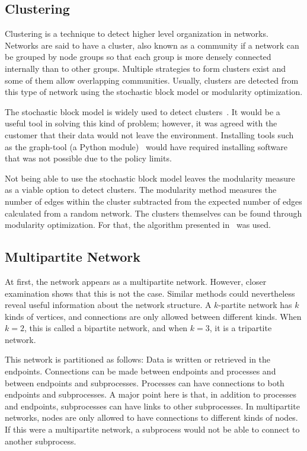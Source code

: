 \documentclass[english, 12pt, a4paper, sci, utf8, a-2b, online, obeyspaces]{aaltothesis}
\begin{document}
\subsection{Clustering}
\label{sec:clustering}
Clustering is a technique to detect higher level organization in networks. Networks are said to have a cluster, also known as a community if a network can be grouped by node groups so that each group is more densely connected internally than to other groups. Multiple strategies to form clusters exist and some of them allow overlapping communities. Usually, clusters are detected from this type of network using the stochastic block model or modularity optimization.

The stochastic block model is widely used to detect clusters~\cite{abbe2015community}. It would be a useful tool in solving this kind of problem; however, it was agreed with the customer that their data would not leave the environment. Installing tools such as the graph-tool (a Python module)~\cite{peixoto2014graph} would have required installing software that was not possible due to the policy limits.

Not being able to use the stochastic block model leaves the modularity measure as a viable option to detect clusters. The modularity method measures the number of edges within the cluster subtracted from the expected number of edges calculated from a random network. The clusters themselves can be found through modularity optimization. For that, the algorithm presented in~\cite{blondel2008fast} was used.

\subsection{Multipartite Network}
\label{sec:multipartite_network}

At first, the network appears as a multipartite network. However, closer examination shows that this is not the case. Similar methods could nevertheless reveal useful information about the network structure. A $k$-partite network has $k$ kinds of vertices, and connections are only allowed between different kinds. When $k = 2$, this is called a bipartite network, and when $k = 3$, it is a tripartite network.

This network is partitioned as follows: Data is written or retrieved in the endpoints. Connections can be made between endpoints and processes and between endpoints and subprocesses. Processes can have connections to both endpoints and subprocesses. A major point here is that, in addition to processes and endpoints, subprocesses can have links to other subprocesses. In multipartite networks, nodes are only allowed to have connections to different kinds of nodes. If this were a multipartite network, a subprocess would not be able to connect to another subprocess.
\end{document}

